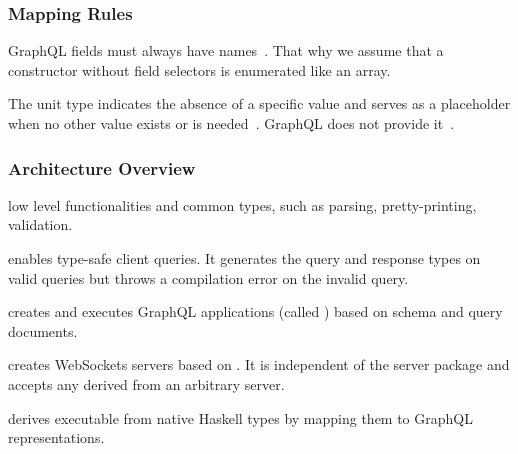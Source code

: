 \begin{frame}\frametitle{Mapping Rules}

\footnotesize
\begin{itemize}

   GraphQL fields must always have names~\cite{gql-spec}. 
  That why we assume that a constructor without field selectors is enumerated like an array.
  

   The unit type indicates the absence of a specific value and serves as a placeholder when no other value exists or is needed~\cite{fsharp-unit}. GraphQL does not provide it~\cite{gql-spec}. 


\end{itemize}
\end{frame}


\begin{frame}\frametitle{Architecture Overview}
  \begin{enumerate} 
  
    \footnotesize

     low level functionalities and common types, such as  parsing, pretty-printing, validation.
  
     enables type-safe client queries. It generates the query and response types on valid queries but throws a compilation error on the invalid query.
  
     creates and executes GraphQL applications (called ) based on schema and query documents.
    
      creates WebSockets servers based on . It is independent of the server package and accepts any  derived from an arbitrary server.
  
     derives executable  from native Haskell types by mapping them to GraphQL representations. 
  
  \end{enumerate}

\end{frame}


